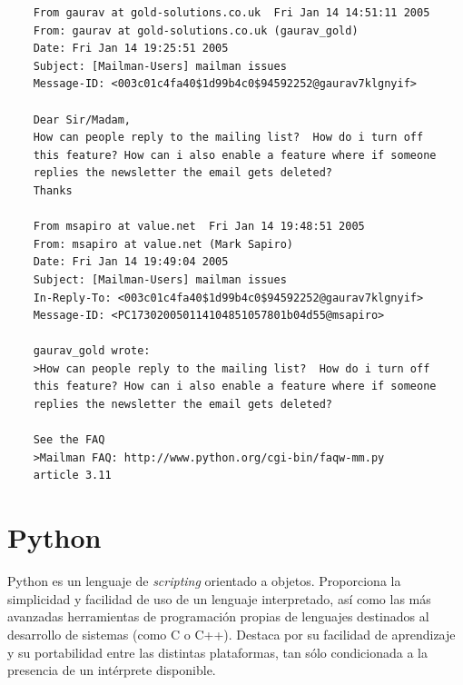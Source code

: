 {\footnotesize
\begin{verbatim}
    From gaurav at gold-solutions.co.uk  Fri Jan 14 14:51:11 2005
    From: gaurav at gold-solutions.co.uk (gaurav_gold)
    Date: Fri Jan 14 19:25:51 2005
    Subject: [Mailman-Users] mailman issues
    Message-ID: <003c01c4fa40$1d99b4c0$94592252@gaurav7klgnyif>

    Dear Sir/Madam,
    How can people reply to the mailing list?  How do i turn off
    this feature? How can i also enable a feature where if someone
    replies the newsletter the email gets deleted?
    Thanks

    From msapiro at value.net  Fri Jan 14 19:48:51 2005
    From: msapiro at value.net (Mark Sapiro)
    Date: Fri Jan 14 19:49:04 2005
    Subject: [Mailman-Users] mailman issues
    In-Reply-To: <003c01c4fa40$1d99b4c0$94592252@gaurav7klgnyif>
    Message-ID: <PC173020050114104851057801b04d55@msapiro>

    gaurav_gold wrote:
    >How can people reply to the mailing list?  How do i turn off
    this feature? How can i also enable a feature where if someone
    replies the newsletter the email gets deleted?

    See the FAQ
    >Mailman FAQ: http://www.python.org/cgi-bin/faqw-mm.py
    article 3.11
\end{verbatim}
}



\section{Python}
Python es un lenguaje de \textit{scripting} orientado a objetos. Proporciona
la simplicidad y facilidad de uso de un lenguaje interpretado, así como las
más avanzadas herramientas de programación propias de lenguajes destinados al
desarrollo de sistemas (como C o C++). Destaca por su facilidad de aprendizaje
y su portabilidad entre las distintas plataformas, tan sólo condicionada a
la presencia de un intérprete disponible.


